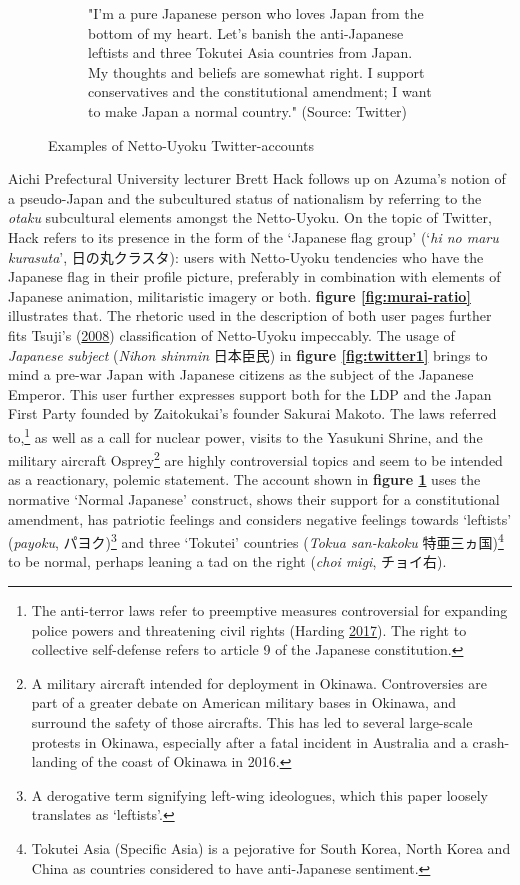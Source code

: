 \documentclass[10pt,british,A4paper,oneside]{memoir}
\begin{document}
\begin{figure}[!htb]
\begin{subfigure}[b]{0.40\textwidth}
 \caption{"I’m a pure Japanese person who loves Japan from the bottom of my heart. Let’s banish the anti-Japanese leftists and three Tokutei Asia countries from Japan. My thoughts and beliefs are somewhat right. I support conservatives and the constitutional amendment; I want to make Japan a normal country." (Source: Twitter)}
 \label{fig:twitter2}
 \end{subfigure}
 \caption{Examples of Netto-Uyoku Twitter-accounts}\label{fig:twitter}
\end{figure}

Aichi Prefectural University lecturer Brett Hack follows up on Azuma's
notion of a pseudo-Japan and the subcultured status of nationalism by
referring to the \emph{otaku} subcultural elements amongst the
Netto-Uyoku. On the topic of Twitter, Hack refers to its presence in the
form of the `Japanese flag group' (`\emph{hi no maru kurasuta}',
日の丸クラスタ): users with Netto-Uyoku tendencies who have the Japanese
flag in their profile picture, preferably in combination with elements
of Japanese animation, militaristic imagery or both. \textbf{figure
\ref{fig:murai-ratio}} illustrates that. The rhetoric used in the
description of both user pages further fits Tsuji's
(\protect\hyperlink{ref-tsuji_eng:_2008}{2008}) classification of
Netto-Uyoku impeccably. The usage of \emph{Japanese subject}
(\emph{Nihon shinmin} 日本臣民) in \textbf{figure \ref{fig:twitter1}}
brings to mind a pre-war Japan with Japanese citizens as the subject of
the Japanese Emperor. This user further expresses support both for the
LDP and the Japan First Party founded by Zaitokukai's founder Sakurai
Makoto. The laws referred to,\footnote{The anti-terror laws refer to
  preemptive measures controversial for expanding police powers and
  threatening civil rights (Harding
  \protect\hyperlink{ref-harding_japan_2017}{2017}). The right to
  collective self-defense refers to article 9 of the Japanese
  constitution.} as well as a call for nuclear power, visits to the
Yasukuni Shrine, and the military aircraft Osprey\footnote{A military
  aircraft intended for deployment in Okinawa. Controversies are part of
  a greater debate on American military bases in Okinawa, and surround
  the safety of those aircrafts. This has led to several large-scale
  protests in Okinawa, especially after a fatal incident in Australia
  and a crash-landing of the coast of Okinawa in 2016.} are highly
controversial topics and seem to be intended as a reactionary, polemic
statement. The account shown in \textbf{figure \ref{fig:twitter2}} uses
the normative `Normal Japanese' construct, shows their support for a
constitutional amendment, has patriotic feelings and considers negative
feelings towards `leftists' (\emph{payoku}, パヨク)\footnote{A
  derogative term signifying left-wing ideologues, which this paper
  loosely translates as `leftists'.} and three `Tokutei' countries
(\emph{Tokua san-kakoku} 特亜三ヵ国)\footnote{Tokutei Asia (Specific
  Asia) is a pejorative for South Korea, North Korea and China as
  countries considered to have anti-Japanese sentiment.} to be normal,
perhaps leaning a tad on the right (\emph{choi migi}, チョイ右).
\end{document}
